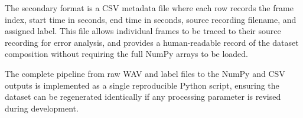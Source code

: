 The secondary format is a CSV metadata file where each row records the frame index, start time in seconds, end time in seconds, source recording filename, and assigned label. This file allows individual frames to be traced to their source recording for error analysis, and provides a human-readable record of the dataset composition without requiring the full NumPy arrays to be loaded.

The complete pipeline from raw WAV and label files to the NumPy and CSV outputs is implemented as a single reproducible Python script, ensuring the dataset can be regenerated identically if any processing parameter is revised during development.
